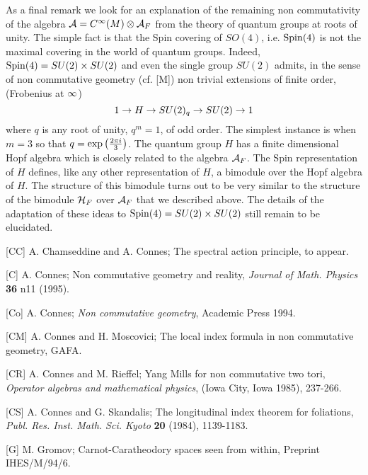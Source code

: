  As a final remark we look for an explanation of
the remaining non commutativity of the algebra ${\cal A} =
C^{\infty} (M) \otimes {\cal A}_F$ from the theory of quantum groups
at roots of unity. The simple fact is that the Spin
covering of $SO(4)$, i.e. $\mathop{\rm Spin}\nolimits (4)$ is not the maximal
covering in the world of quantum groups. Indeed, $\mathop{\rm Spin}\nolimits
(4) = SU(2) \times SU(2)$ and even the single group $SU(2)$
admits, in the sense of non commutative geometry (cf.
[M]) non trivial extensions of finite order, (Frobenius
at $\infty$)
$$
1 \rightarrow H \rightarrow SU(2)_q \rightarrow SU(2) \rightarrow 1
$$
where $q$ is any root of unity, $q^m =1$, of odd order.
The simplest instance is when $m=3$ so that $q=\exp
\left( {2\pi i \over 3}\right)$. The quantum group $H$
has a finite dimensional Hopf algebra which is closely
related to the algebra ${\cal A}_F$. The Spin representation
of $H$ defines, like any other representation of $H$, a
bimodule over the Hopf algebra of $H$. The structure of
this bimodule turns out to be very similar to the
structure of the bimodule ${\cal H}_F$ over ${\cal A}_F$ that we
described above. The details of the adaptation of these
ideas to $\mathop{\rm Spin}\nolimits (4) = SU (2) \times SU(2)$ still remain to be
elucidated.

\vfill\eject


\medskip

\item{[CC]} A. Chamseddine and A. Connes; The
spectral action principle, to appear.

\item{[C]} A. Connes; Non commutative geometry and
reality, {\it Journal of Math. Physics} {\bf 36} n11
(1995).

\item{[Co]} A. Connes; {\it Non commutative geometry},
Academic Press 1994.

\item{[CM]} A. Connes and H. Moscovici; The local index
formula in non commutative geometry, GAFA.

\item{[CR]} A. Connes and M. Rieffel; Yang Mills for non
commutative two tori, {\it Operator algebras and
mathematical physics}, (Iowa City, Iowa 1985), 237-266.

\item{[CS]} A. Connes and G. Skandalis; The longitudinal
index theorem for foliations, {\it Publ. Res. Inst. Math.
Sci. Kyoto} {\bf 20} (1984), 1139-1183.

\item{[G]} M. Gromov; Carnot-Caratheodory spaces seen
from within, Preprint \break IHES/M/94/6.

